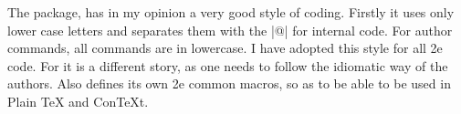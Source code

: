 The \pgfname package, has in my opinion a very good style of coding. Firstly it uses only lower case letters and separates them with the |@| for internal code. For author commands, all commands are in lowercase. I have adopted this style for all \latex2e code. For  it is a different story, as one needs to follow the idiomatic way of the  authors. Also \pgfname defines its own \latex2e common macros, so as to be able to be used in Plain TeX and ConTeXt. 














